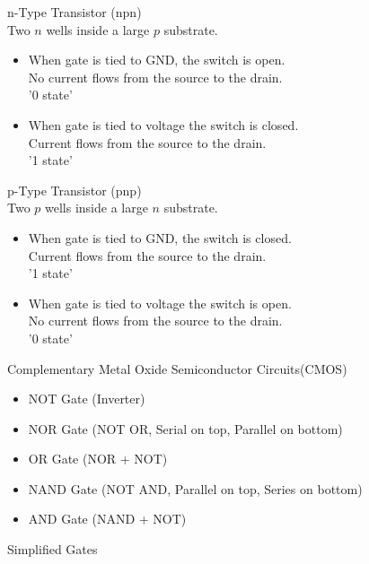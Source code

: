 \documentclass{article}
\begin{document}
\noindent
n-Type Transistor (npn)\\
Two $n$ wells inside a large $p$ substrate.
\begin{itemize}
  \item When gate is tied to GND, the switch is open.\\
    No current flows from the source to the drain.\\
    '0 state'
  \item When gate is tied to voltage the switch is closed.\\
    Current flows from the source to the drain.\\
    '1 state'
\end{itemize}

\noindent
p-Type Transistor (pnp)\\
Two $p$ wells inside a large $n$ substrate.
\begin{itemize}
  \item When gate is tied to GND, the switch is closed.\\
    Current flows from the source to the drain.\\
    '1 state'
  \item When gate is tied to voltage the switch is open.\\
    No current flows from the source to the drain.\\
    '0 state'
\end{itemize}

\noindent
\Large
Complementary Metal Oxide Semiconductor Circuits(CMOS)\\
\normalsize
\begin{itemize}
  \item NOT Gate (Inverter)
  \item NOR Gate (NOT OR, Serial on top, Parallel on bottom)
  \item OR Gate (NOR + NOT)
  \item NAND Gate (NOT AND, Parallel on top, Series on bottom)
  \item AND Gate (NAND + NOT)
\end{itemize}

\noindent
\Large
Simplified Gates\\
\normalsize
\end{document}
